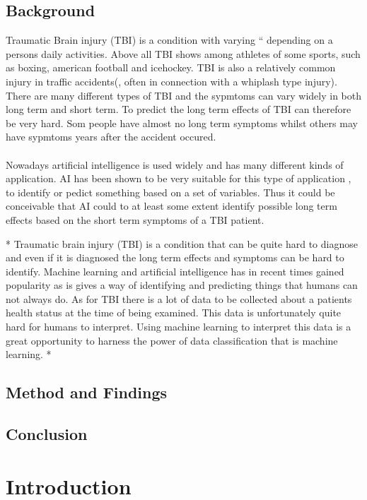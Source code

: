 \documentclass[11pt]{article}
\begin{document}
\subsection*{Background}

Traumatic Brain injury (TBI) is a condition with varying `` depending on a persons daily activities. Above all TBI shows among athletes of some sports, such as boxing, american football and icehockey. TBI is also a relatively common injury in traffic accidents(, often in connection with a whiplash type injury). There are many different types of TBI and the sypmtoms can vary widely in both long term and short term. To predict the long term effects of TBI can therefore be very hard. Som people have almost no long term symptoms whilst others may have sypmtoms years after the accident occured.\\
\\
Nowadays artificial intelligence is used widely and has many different kinds of application. AI has been shown to be very suitable for this type of application , to identify or pedict something based on a set of variables. Thus it could be conceivable that AI could to at least some extent identify possible long term effects based on the short term symptoms of a TBI patient.

*
Traumatic brain injury (TBI) is a condition that can be quite hard to diagnose and even if it is diagnosed the long term effects and symptoms can be hard to identify. Machine learning and artificial intelligence has in recent times gained popularity as is gives a way of identifying and predicting things that humans can not always do. As for TBI there is a lot of data to be collected about a patients health status at the time of being examined. This data is unfortunately quite hard for humans to interpret. Using machine learning to interpret this data is a great opportunity to harness the power of data classification that is machine learning.
*

\subsection*{Method and Findings}

\subsection*{Conclusion}

\tableofcontents

\section{Introduction}
\end{document}

